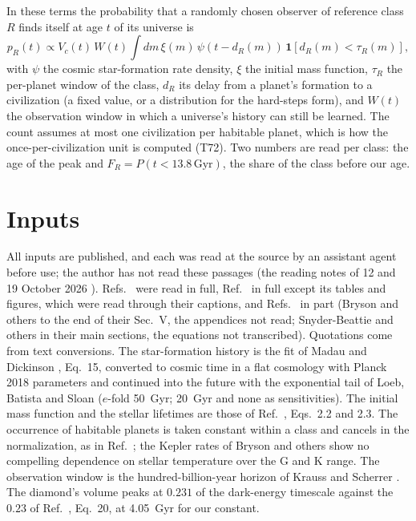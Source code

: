 \documentclass[pre,twocolumn,superscriptaddress,nofootinbib]{revtex4-2}
\begin{document}
In these terms the probability that a randomly chosen observer of reference class $R$ finds itself at age $t$ of its
universe is
\begin{equation}
p_R(t) \propto V_c(t)\, W(t) \int dm\, \xi(m)\, \psi(t - d_R(m))\, \mathbf{1}[d_R(m) < \tau_R(m)],
\label{eq:measure}
\end{equation}
with $\psi$ the cosmic star-formation rate density, $\xi$ the initial mass function, $\tau_R$ the per-planet window of
the class, $d_R$ its delay from a planet's formation to a civilization (a fixed value, or a distribution for the
hard-steps form), and $W(t)$ the observation window in which a universe's history can still be learned. The count
assumes at most one civilization per habitable planet, which is how the once-per-civilization unit is computed (T72).
Two numbers are read per class: the age of the peak and $F_R = P(t < 13.8\,\mathrm{Gyr})$, the share of the class
before our age.

\section{Inputs}

All inputs are published, and each was read at the source by an assistant agent before use; the author has not read
these passages (the reading notes of 12 and 19 October 2026 \cite{repo}).
Refs.~\cite{LBS16,BHKP07,KS07,HKW18,LL18,Kipping25,Carter83,Hanson98} were read in full, Ref.~\cite{MD14} in full
except its tables and figures, which were read through their captions, and Refs.~\cite{Bryson21,SB21} in part (Bryson
and others to the end of their Sec.~V, the appendices not read; Snyder-Beattie and others in their main sections, the
equations not transcribed). Quotations come from text conversions. The star-formation history is the fit of Madau and
Dickinson \cite{MD14}, Eq.~15, converted to cosmic
time in a flat cosmology with Planck 2018 parameters and continued into the future with the exponential tail of Loeb,
Batista and Sloan \cite{LBS16} ($e$-fold 50~Gyr; 20~Gyr and none as sensitivities). The initial mass function and the
stellar lifetimes are those of Ref.~\cite{LBS16}, Eqs.~2.2 and 2.3. The occurrence of habitable planets is taken
constant within a class and cancels in the normalization, as in Ref.~\cite{LBS16}; the Kepler rates of Bryson and
others \cite{Bryson21} show no compelling dependence on stellar temperature over the G and K range. The observation
window is the hundred-billion-year horizon of Krauss and Scherrer \cite{KS07}. The diamond's volume peaks at $0.231$ of
the dark-energy timescale against the $0.23$ of Ref.~\cite{BHKP07}, Eq.~20, at 4.05~Gyr for our constant.
\end{document}
